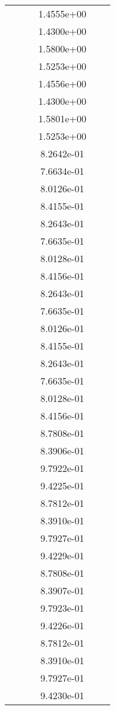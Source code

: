 \begin{xltabular}{\textwidth}{r|rS[table-format=1.3e+2]S[table-format=1.4e+2]S[table-format=1.4e+2]S[table-format=-1.5]}
&  &  & 1.4555e+00 & & \\
&  &  & 1.4300e+00 & & \\
&  &  & 1.5800e+00 & & \\
&  &  & 1.5253e+00 & & \\
&  &  & 1.4556e+00 & & \\
&  &  & 1.4300e+00 & & \\
&  &  & 1.5801e+00 & & \\
&  &  & 1.5253e+00 & & \\
&  &  & 8.2642e-01 & & \\
&  &  & 7.6634e-01 & & \\
&  &  & 8.0126e-01 & & \\
&  &  & 8.4155e-01 & & \\
&  &  & 8.2643e-01 & & \\
&  &  & 7.6635e-01 & & \\
&  &  & 8.0128e-01 & & \\
&  &  & 8.4156e-01 & & \\
&  &  & 8.2643e-01 & & \\
&  &  & 7.6635e-01 & & \\
&  &  & 8.0126e-01 & & \\
&  &  & 8.4155e-01 & & \\
&  &  & 8.2643e-01 & & \\
&  &  & 7.6635e-01 & & \\
&  &  & 8.0128e-01 & & \\
&  &  & 8.4156e-01 & & \\
&  &  & 8.7808e-01 & & \\
&  &  & 8.3906e-01 & & \\
&  &  & 9.7922e-01 & & \\
&  &  & 9.4225e-01 & & \\
&  &  & 8.7812e-01 & & \\
&  &  & 8.3910e-01 & & \\
&  &  & 9.7927e-01 & & \\
&  &  & 9.4229e-01 & & \\
&  &  & 8.7808e-01 & & \\
&  &  & 8.3907e-01 & & \\
&  &  & 9.7923e-01 & & \\
&  &  & 9.4226e-01 & & \\
&  &  & 8.7812e-01 & & \\
&  &  & 8.3910e-01 & & \\
&  &  & 9.7927e-01 & & \\
&  &  & 9.4230e-01 & & \\

\end{xltabular}

